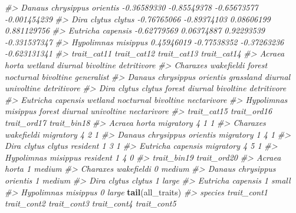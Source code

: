 \documentclass[
]{article}
\newenvironment{Shaded}{\begin{snugshade}}{\end{snugshade}}
\newcommand{\CommentTok}[1]{\textcolor[rgb]{0.56,0.35,0.01}{\textit{#1}}}
\newcommand{\FunctionTok}[1]{\textcolor[rgb]{0.13,0.29,0.53}{\textbf{#1}}}
\newcommand{\NormalTok}[1]{#1}
\begin{document}
\begin{Shaded}
\begin{Highlighting}[]
\CommentTok{\#\textgreater{} Danaus chrysippus orientis {-}0.36589330 {-}0.85549378 {-}0.65673577 {-}0.001454239}
\CommentTok{\#\textgreater{} Dira clytus clytus         {-}0.76765066 {-}0.89374103  0.08606199  0.881129756}
\CommentTok{\#\textgreater{} Eutricha capensis          {-}0.62779569  0.06374887  0.92293539 {-}0.331537347}
\CommentTok{\#\textgreater{} Hypolimnas misippus         0.45946019 {-}0.77538352 {-}0.37263236 {-}0.623131341}
\CommentTok{\#\textgreater{}                            trait\_cat11 trait\_cat12 trait\_cat13 trait\_cat14}
\CommentTok{\#\textgreater{} Acraea horta                   wetland     diurnal   bivoltine detritivore}
\CommentTok{\#\textgreater{} Charaxes wakefieldi             forest   nocturnal   bivoltine  generalist}
\CommentTok{\#\textgreater{} Danaus chrysippus orientis   grassland     diurnal  univoltine detritivore}
\CommentTok{\#\textgreater{} Dira clytus clytus              forest     diurnal   bivoltine detritivore}
\CommentTok{\#\textgreater{} Eutricha capensis              wetland   nocturnal   bivoltine nectarivore}
\CommentTok{\#\textgreater{} Hypolimnas misippus             forest     diurnal  univoltine nectarivore}
\CommentTok{\#\textgreater{}                            trait\_cat15 trait\_ord16 trait\_ord17 trait\_bin18}
\CommentTok{\#\textgreater{} Acraea horta                 migratory           4           1           1}
\CommentTok{\#\textgreater{} Charaxes wakefieldi          migratory           4           2           1}
\CommentTok{\#\textgreater{} Danaus chrysippus orientis   migratory           1           4           1}
\CommentTok{\#\textgreater{} Dira clytus clytus            resident           1           3           1}
\CommentTok{\#\textgreater{} Eutricha capensis            migratory           4           5           1}
\CommentTok{\#\textgreater{} Hypolimnas misippus           resident           1           4           0}
\CommentTok{\#\textgreater{}                            trait\_bin19 trait\_ord20}
\CommentTok{\#\textgreater{} Acraea horta                         1      medium}
\CommentTok{\#\textgreater{} Charaxes wakefieldi                  0      medium}
\CommentTok{\#\textgreater{} Danaus chrysippus orientis           1      medium}
\CommentTok{\#\textgreater{} Dira clytus clytus                   1       large}
\CommentTok{\#\textgreater{} Eutricha capensis                    1       small}
\CommentTok{\#\textgreater{} Hypolimnas misippus                  0       large}
\FunctionTok{tail}\NormalTok{(all\_traits)}
\CommentTok{\#\textgreater{}       species trait\_cont1 trait\_cont2 trait\_cont3 trait\_cont4 trait\_cont5}

\end{Highlighting}
\end{Shaded}
\end{document}
